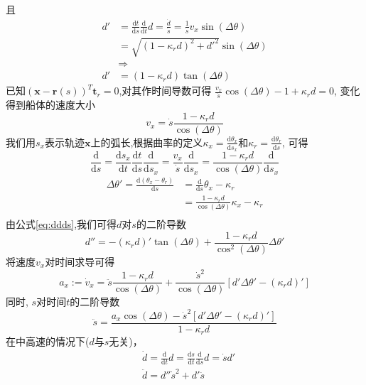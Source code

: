 且
\begin{equation}
  \label{eq:ddds}
  \begin{aligned}
    d'
    &=\frac{\mathrm{d} t}{\mathrm{d} s} \frac{\mathrm{d} }{\mathrm{d} t} d
    =\frac{\dot{d}}{\dot{s}} = \frac{1}{\dot{s}} v_x \sin(\Delta \theta) \\
    &=\sqrt{(1-{\kappa}_r d)^2 +d'^2}  \sin(\Delta \theta) \\
    & \Rightarrow \\
    d'
    &=(1-{\kappa}_rd) \tan(\Delta \theta)
  \end{aligned}
\end{equation}
已知$(\bm{x}-\bm{r}(s))^T \bm{t}_r = 0$,对其作时间导数可得 $  \frac{v_x}{\dot{s}} \cos(\Delta \theta) -1 + {\kappa}_r d = 0$, 变化得到船体的速度大小
\begin{equation}
  v_x = \dot{s} \frac{1-{\kappa}_r d}{\cos(\Delta \theta)}
\end{equation}
我们用$s_x$表示轨迹$\bm{x}$上的弧长,根据曲率的定义${\kappa_x}=\frac{\mathrm{d} \theta_x}{\mathrm{d}s_x}$和${\kappa_r}=\frac{\mathrm{d} \theta_r}{\mathrm{d}s}$,
可得
\begin{equation}
  \frac{\mathrm{d}}{\mathrm{d}s} =\frac{\mathrm{d} s_x}{\mathrm{d}t}
  \frac{\mathrm{d} t}{\mathrm{d} s} \frac{\mathrm{d}}{\mathrm{d}s_x}
  = \frac{v_x}{\dot{s}} \frac{\mathrm{d}}{\mathrm{d}s_x}
  =\frac{1-{\kappa}_r d}{\cos(\Delta \theta)} \frac{\mathrm{d}}{\mathrm{d}s_x}
\end{equation}
\begin{equation}
  \begin{aligned}
    \Delta \theta ' = \frac{\mathrm{d}( {\theta}_x - {\theta}_r)}{\mathrm{d}s}
    &= \frac{\mathrm{d}}{\mathrm{d} s} {\theta}_x - {\kappa}_r \\
    &= \frac{1-{\kappa}_r d}{\cos(\Delta \theta)} {\kappa}_x - {\kappa}_r  \\
  \end{aligned}
\end{equation}
由公式\ref{eq:ddds},我们可得$d$对$s$的二阶导数
\begin{equation}
  d''=-({\kappa}_r  d)' \tan(\Delta \theta) + \frac{1-{\kappa}_r d}
  {\cos^2(\Delta \theta)}    \Delta \theta '
\end{equation}
将速度$v_x$对时间求导可得
\begin{equation}
  a_x := \dot{v}_x = \ddot{s}\frac{1-{\kappa}_r d}{\cos(\Delta \theta)}  +
  \frac{\dot{s}^2}{\cos(\Delta \theta)}[d' \Delta \theta' - ({\kappa}_r d)']
\end{equation}
同时, $s$对时间$t$的二阶导数
\begin{equation}
  \ddot{s}=\frac{a_x \cos(\Delta \theta)- \dot{s}^2
  [d' \Delta \theta' - ({\kappa}_r d)']}{1-{\kappa}_r d}
\end{equation}
在中高速的情况下($d$与$s$无关)，
\begin{equation}
  \begin{aligned}
    &\dot{d}=\frac{\mathrm{d}}{\mathrm{d} t}d=\frac{\mathrm{d}s}{\mathrm{d} t}
    \frac{\mathrm{d}}{\mathrm{d} s}d= \dot{s}d' \\
    &\ddot{d}=d'' \dot{s}^2 + d' \ddot{s}
  \end{aligned}
\end{equation}


